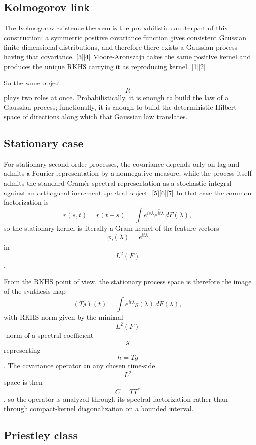 \documentclass[
]{article}
\begin{document}
\subsection{Kolmogorov link}\label{kolmogorov-link}

The Kolmogorov existence theorem is the probabilistic counterpart of
this construction: a symmetric positive covariance function gives
consistent Gaussian finite-dimensional distributions, and therefore
there exists a Gaussian process having that covariance. {[}3{]}{[}4{]}
Moore-Aronszajn takes the same positive kernel and produces the unique
RKHS carrying it as reproducing kernel. {[}1{]}{[}2{]}

So the same object \[R\] plays two roles at once. Probabilistically, it
is enough to build the law of a Gaussian process; functionally, it is
enough to build the deterministic Hilbert space of directions along
which that Gaussian law translates.

\subsection{Stationary case}\label{stationary-case}

For stationary second-order processes, the covariance depends only on
lag and admits a Fourier representation by a nonnegative measure, while
the process itself admits the standard Cramér spectral representation as
a stochastic integral against an orthogonal-increment spectral object.
{[}5{]}{[}6{]}{[}7{]} In that case the common factorization is \[
r(s,t)=r(t-s)=\int e^{is\lambda}\overline{e^{it\lambda}}\,dF(\lambda),
\] so the stationary kernel is literally a Gram kernel of the feature
vectors \[\phi_t(\lambda)=e^{it\lambda}\] in \[L^2(F)\].

From the RKHS point of view, the stationary process space is therefore
the image of the synthesis map \[
(Tg)(t)=\int e^{it\lambda}g(\lambda)\,dF(\lambda),
\] with RKHS norm given by the minimal \[L^2(F)\]-norm of a spectral
coefficient \[g\] representing \[h=Tg\]. The covariance operator on any
chosen time-side \[L^2\] space is then \[C=T T^*\], so the operator is
analyzed through its spectral factorization rather than through
compact-kernel diagonalization on a bounded interval.

\subsection{Priestley class}\label{priestley-class}
\end{document}
